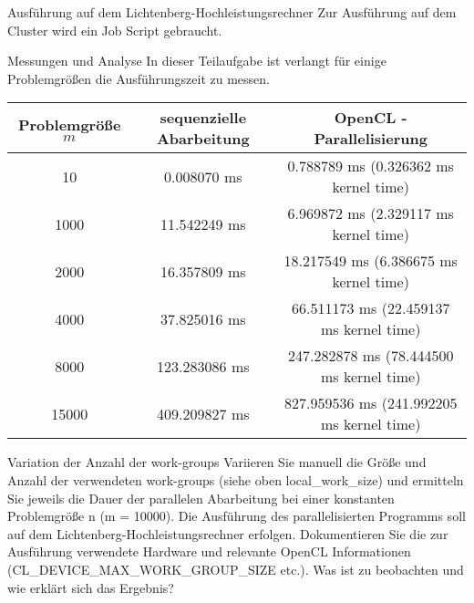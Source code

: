 \documentclass[
ngerman,
subtask=ruled %
]{tudaexercise}
\begin{document}
	
	\begin{task}{Ausführung auf dem Lichtenberg-Hochleistungsrechner} 
		Zur Ausführung auf dem Cluster wird ein Job Script gebraucht.
		
	\end{task}

	\begin{task}{Messungen und Analyse} 
		In dieser Teilaufgabe ist verlangt für einige Problemgrößen die Ausführungszeit zu messen.
		
		\begin{tabular}{|c|c|c|}
			\hline
			Problemgröße $m$ & sequenzielle Abarbeitung & OpenCL - Parallelisierung \\
			\hline
			10 & 0.008070 ms & 0.788789 ms (0.326362 ms kernel time) \\
			\hline
			1000 & 11.542249 ms & 6.969872 ms (2.329117 ms kernel time) \\
			\hline
			2000 & 16.357809 ms & 18.217549 ms (6.386675 ms kernel time) \\
			\hline
			4000 & 37.825016 ms & 66.511173 ms (22.459137 ms kernel time) \\
			\hline
			8000 & 123.283086 ms & 247.282878 ms (78.444500 ms kernel time) \\
			\hline
			15000 & 409.209827 ms & 827.959536 ms (241.992205 ms kernel time) \\
			\hline
		\end{tabular}
	\end{task}

	\begin{task} {Variation der Anzahl der work-groups}
		Variieren Sie manuell die Größe und Anzahl der verwendeten work-groups (siehe oben local\_work\_size) und ermitteln
		Sie jeweils die Dauer der parallelen Abarbeitung bei einer konstanten Problemgröße n (m = 10000). Die Ausführung
		des parallelisierten Programms soll auf dem Lichtenberg-Hochleistungsrechner erfolgen. Dokumentieren Sie die zur
		Ausführung verwendete Hardware und relevante OpenCL Informationen (CL\_DEVICE\_MAX\_WORK\_GROUP\_SIZE etc.).
		Was ist zu beobachten und wie erklärt sich das Ergebnis?
	\end{task}

	
\end{document}
